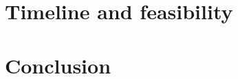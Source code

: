 \documentclass{article}
\begin{document}
\begin{comment}
Ultimately, unequal access to blue space is an environmental injustice and this framework will lead my research. Environmental justice is a multi-faceted concept which brings together social and environmental concerns. Amongst other things, it advocates for the equitable access to environmental benefits. The dimension of justice that I will focus on is recognition. Recognition justice deals with people and groups’ perceptions, values and preferences which may influence the ways in which they interact, or not, with a blue space \parencite{anguelovski2020expanding}.
\end{comment}

\section{Timeline and feasibility}


\section{Conclusion}

\printbibliography
\end{document}
